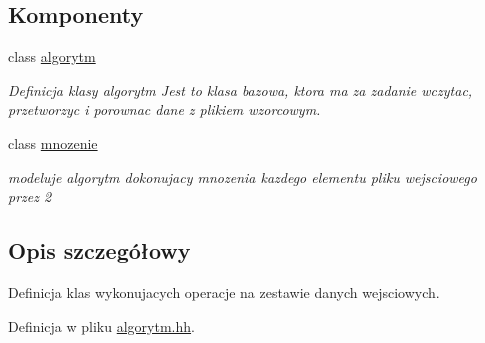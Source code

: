 \subsection*{\-Komponenty}
\begin{DoxyCompactItemize}
\item 
class \hyperlink{classalgorytm}{algorytm}
\begin{DoxyCompactList}\small\item\em \-Definicja klasy algorytm \-Jest to klasa bazowa, ktora ma za zadanie wczytac, przetworzyc i porownac dane z plikiem wzorcowym. \end{DoxyCompactList}\item 
class \hyperlink{classmnozenie}{mnozenie}
\begin{DoxyCompactList}\small\item\em modeluje algorytm dokonujacy mnozenia kazdego elementu pliku wejsciowego przez 2 \end{DoxyCompactList}\end{DoxyCompactItemize}


\subsection{\-Opis szczegółowy}
\-Definicja klas wykonujacych operacje na zestawie danych wejsciowych. 

\-Definicja w pliku \hyperlink{algorytm_8hh_source}{algorytm.\-hh}.

